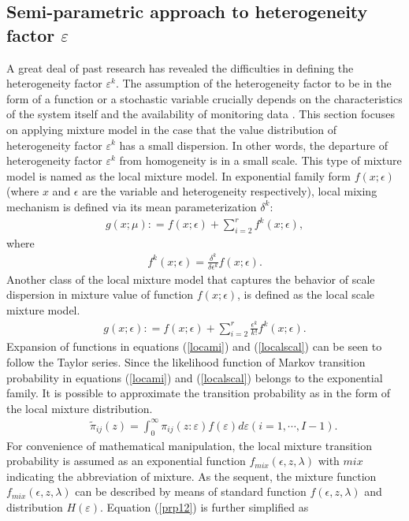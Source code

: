 \subsection{Semi-parametric approach to heterogeneity factor $\varepsilon$}
\label{643}
A great deal of past research has revealed the difficulties in defining the heterogeneity factor $\varepsilon^k$. The assumption of the heterogeneity factor to be in the form of a function or a stochastic variable crucially depends on the characteristics of the system itself and the availability of monitoring data \cite{lancaster90,Marriott06}. This section focuses on applying mixture model in the case that the value distribution of heterogeneity factor $\varepsilon^k$ has a small dispersion. In other words, the departure of heterogeneity factor $\varepsilon^k$ from homogeneity is in a small scale. This type of mixture model is named as the local mixture model. In exponential family form $f(x;\epsilon)$ (where $x$ and $\epsilon$ are the variable and heterogeneity respectively), local mixing mechanism is defined via its mean parameterization $\delta^{k}$: 
\begin{eqnarray}
g(x;\mu) : = f(x;\epsilon) + \sum_{i=2}^{r}f^{k}(x;\epsilon),\label{locami} 
\end{eqnarray}
where
\begin{eqnarray}
f^{k}(x;\epsilon)=\frac{\delta^{k}}{\delta\epsilon^{k}}f(x;\epsilon). \nonumber
\end{eqnarray}
Another class of the local mixture model that captures the behavior of scale dispersion in mixture value of function $f(x;\epsilon)$, is defined as the local scale mixture model.
\begin{eqnarray}
g(x;\epsilon) : = f(x;\epsilon) + \sum_{i=2}^{r}\frac{\epsilon^k}{k!}f^{k}(x;\epsilon). \label{localscal} 
\end{eqnarray}
Expansion of functions in equations (\ref{locami}) and (\ref{localscal}) can be seen to follow the Taylor series. Since the likelihood function of Markov transition probability in equations (\ref{locami}) and (\ref{localscal}) belongs to the exponential family. It is possible to approximate the transition probability as in the form of the local mixture distribution. 
%
\begin{eqnarray}
&& \tilde{\pi}_{ij}(z)=\int_0^\infty \pi_{ij}(z:\varepsilon)f(\varepsilon)d\varepsilon 
 (i=1,\cdots,I-1) . \label{prp12}
\end{eqnarray}
%
For convenience of mathematical manipulation, the local mixture transition probability is assumed as an exponential function $f_{mix}(\epsilon,z,\lambda)$ with $mix$ indicating the abbreviation of mixture. As the sequent, the mixture function $f_{mix}(\epsilon,z,\lambda)$ can be described by means of standard function $f(\epsilon,z,\lambda)$ and distribution $H(\varepsilon)$. Equation (\ref{prp12}) is further simplified as 
